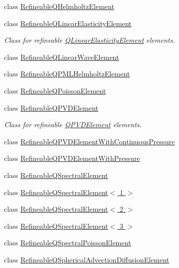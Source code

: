 \begin{DoxyCompactItemize}
class \hyperlink{classoomph_1_1RefineableQHelmholtzElement}{Refineable\+Q\+Helmholtz\+Element}
\item 
class \hyperlink{classoomph_1_1RefineableQLinearElasticityElement}{Refineable\+Q\+Linear\+Elasticity\+Element}
\begin{DoxyCompactList}\small\item\em Class for refineable \hyperlink{classoomph_1_1QLinearElasticityElement}{Q\+Linear\+Elasticity\+Element} elements. \end{DoxyCompactList}\item 
class \hyperlink{classoomph_1_1RefineableQLinearWaveElement}{Refineable\+Q\+Linear\+Wave\+Element}
\item 
class \hyperlink{classoomph_1_1RefineableQPMLHelmholtzElement}{Refineable\+Q\+P\+M\+L\+Helmholtz\+Element}
\item 
class \hyperlink{classoomph_1_1RefineableQPoissonElement}{Refineable\+Q\+Poisson\+Element}
\item 
class \hyperlink{classoomph_1_1RefineableQPVDElement}{Refineable\+Q\+P\+V\+D\+Element}
\begin{DoxyCompactList}\small\item\em Class for refineable \hyperlink{classoomph_1_1QPVDElement}{Q\+P\+V\+D\+Element} elements. \end{DoxyCompactList}\item 
class \hyperlink{classoomph_1_1RefineableQPVDElementWithContinuousPressure}{Refineable\+Q\+P\+V\+D\+Element\+With\+Continuous\+Pressure}
\item 
class \hyperlink{classoomph_1_1RefineableQPVDElementWithPressure}{Refineable\+Q\+P\+V\+D\+Element\+With\+Pressure}
\item 
class \hyperlink{classoomph_1_1RefineableQSpectralElement}{Refineable\+Q\+Spectral\+Element}
\item 
class \hyperlink{classoomph_1_1RefineableQSpectralElement_3_011_01_4}{Refineable\+Q\+Spectral\+Element$<$ 1 $>$}
\item 
class \hyperlink{classoomph_1_1RefineableQSpectralElement_3_012_01_4}{Refineable\+Q\+Spectral\+Element$<$ 2 $>$}
\item 
class \hyperlink{classoomph_1_1RefineableQSpectralElement_3_013_01_4}{Refineable\+Q\+Spectral\+Element$<$ 3 $>$}
\item 
class \hyperlink{classoomph_1_1RefineableQSpectralPoissonElement}{Refineable\+Q\+Spectral\+Poisson\+Element}
\item 
class \hyperlink{classoomph_1_1RefineableQSphericalAdvectionDiffusionElement}{Refineable\+Q\+Spherical\+Advection\+Diffusion\+Element}

\end{DoxyCompactItemize}
